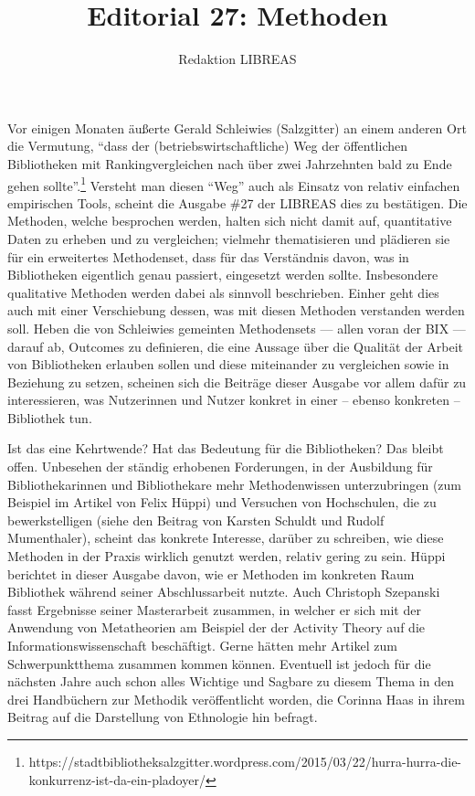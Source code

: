 \documentclass[a4paper,
fontsize=11pt,
oneside,
numbers=noperiodatend,
parskip=half-,
bibliography=totoc,
final
]{scrartcl}
\title{\LARGE{Editorial 27: Methoden}} %
\author{Redaktion LIBREAS} %
\date{}
\begin{document}
\maketitle
\thispagestyle{fancyplain} 


Vor einigen Monaten äußerte Gerald Schleiwies (Salzgitter) an einem
anderen Ort die Vermutung, \enquote{dass der (betriebswirtschaftliche)
Weg der öffentlichen Bibliotheken mit Rankingvergleichen nach über zwei
Jahrzehnten bald zu Ende gehen sollte}.\footnote{https://stadtbibliotheksalzgitter.wordpress.com/2015/03/22/hurra-hurra-die-konkurrenz-ist-da-ein-pladoyer/}
Versteht man diesen \enquote{Weg} auch als Einsatz von relativ einfachen
empirischen Tools, scheint die Ausgabe \#27 der LIBREAS dies zu
bestätigen. Die Methoden, welche besprochen werden, halten sich nicht
damit auf, quantitative Daten zu erheben und zu vergleichen; vielmehr
thematisieren und plädieren sie für ein erweitertes Methodenset, dass
für das Verständnis davon, was in Bibliotheken eigentlich genau
passiert, eingesetzt werden sollte. Insbesondere qualitative Methoden
werden dabei als sinnvoll beschrieben. Einher geht dies auch mit einer
Verschiebung dessen, was mit diesen Methoden verstanden werden soll.
Heben die von Schleiwies gemeinten Methodensets --- allen voran der BIX
--- darauf ab, Outcomes zu definieren, die eine Aussage über die
Qualität der Arbeit von Bibliotheken erlauben sollen und diese
miteinander zu vergleichen sowie in Beziehung zu setzen, scheinen sich
die Beiträge dieser Ausgabe vor allem dafür zu interessieren, was
Nutzerinnen und Nutzer konkret in einer -- ebenso konkreten --
Bibliothek tun.

Ist das eine Kehrtwende? Hat das Bedeutung für die Bibliotheken? Das
bleibt offen. Unbesehen der ständig erhobenen Forderungen, in der
Ausbildung für Bibliothekarinnen und Bibliothekare mehr Methodenwissen
unterzubringen (zum Beispiel im Artikel von Felix Hüppi) und Versuchen
von Hochschulen, die zu bewerkstelligen (siehe den Beitrag von Karsten
Schuldt und Rudolf Mumenthaler), scheint das konkrete Interesse, darüber
zu schreiben, wie diese Methoden in der Praxis wirklich genutzt werden,
relativ gering zu sein. Hüppi berichtet in dieser Ausgabe davon, wie er
Methoden im konkreten Raum Bibliothek während seiner Abschlussarbeit
nutzte. Auch Christoph Szepanski fasst Ergebnisse seiner Masterarbeit
zusammen, in welcher er sich mit der Anwendung von Metatheorien am
Beispiel der der Activity Theory auf die Informationswissenschaft
beschäftigt. Gerne hätten mehr Artikel zum Schwerpunktthema zusammen
kommen können. Eventuell ist jedoch für die nächsten Jahre auch schon
alles Wichtige und Sagbare zu diesem Thema in den drei Handbüchern zur
Methodik veröffentlicht worden, die Corinna Haas in ihrem Beitrag auf
die Darstellung von Ethnologie hin befragt.
\end{document}
